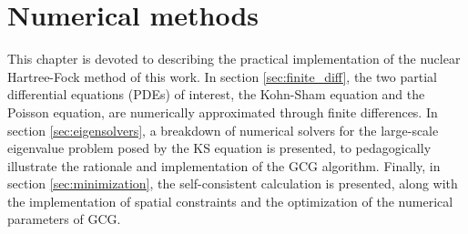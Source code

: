 \chapter{Numerical methods}
\label{chap:numerical}
This chapter is devoted to describing the practical implementation of the nuclear Hartree-Fock method of this work. In section \ref{sec:finite_diff}, the two partial differential equations (PDEs) of interest, the Kohn-Sham equation and the Poisson equation, are numerically approximated through finite differences. In section \ref{sec:eigensolvers}, a breakdown of numerical solvers for the large-scale eigenvalue problem posed by the KS equation is presented, to pedagogically illustrate the rationale and implementation of the GCG algorithm. Finally, in section \ref{sec:minimization}, the self-consistent calculation is presented, along with the implementation of spatial constraints and the optimization of the numerical parameters of GCG.


